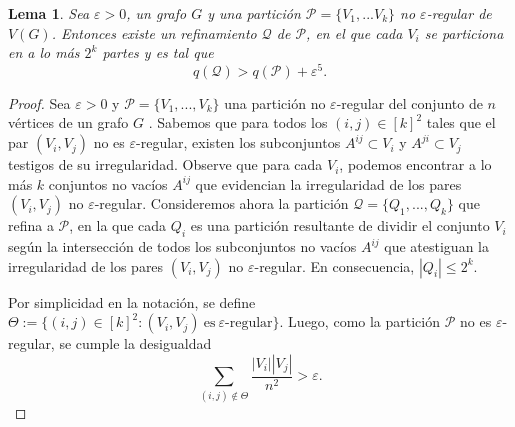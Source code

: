 \documentclass{article}[14pts]
\newtheorem{lema}{Lema}
\let\varepsilon=\varepsilon
\begin{document}
\begin{lema} \label{Energy boost particiones}
    Sea $\varepsilon > 0$, un grafo $G$ y una partición $\mathcal{P} = \lbrace V_1,...V_k\rbrace$ no $\varepsilon$-regular de $V(G)$. Entonces existe un refinamiento $\mathcal{Q}$ de $\mathcal{P}$, en el que cada $V_i$ se particiona en a lo más $2^{k}$ partes y es tal que
    \begin{equation*}
        q(\mathcal{Q}) > q(\mathcal{P}) + \varepsilon^{5}.
    \end{equation*}
\end{lema}

\begin{proof}
    Sea $\varepsilon > 0$ y $\mathcal{P} = \lbrace V_1,...,V_k\rbrace$ una partición no $\varepsilon$-regular del conjunto de $n$ vértices de un grafo $G$ . Sabemos que para todos los $(i,j)\in [k]^{2}$ tales que el par $(V_i, V_j)$ no es $\varepsilon$-regular, existen los subconjuntos $A^{ij}\subset V_i$ y $A^{ji}\subset V_j$ testigos de su irregularidad. Observe que para cada $V_i$, podemos encontrar a lo más $k$ conjuntos no vacíos $A^{ij}$ que evidencian la irregularidad de los pares $(V_i, V_j)$ no $\varepsilon$-regular. Consideremos ahora la partición $\mathcal{Q} = \lbrace Q_1,...,Q_k\rbrace$ que refina a $\mathcal{P}$, en la que cada $Q_i$ es una partición resultante de dividir el conjunto $V_i$ según la intersección de todos los subconjuntos no vacíos $A^{ij}$ que atestiguan la irregularidad de los pares $(V_i, V_j)$ no $\varepsilon$-regular. En consecuencia, $|Q_i| \leq 2^{k}$.

    Por simplicidad en la notación, se define $\Theta := \lbrace (i,j)\in [k]^{2} : (V_i,V_j)\ \text{es}\ \varepsilon\text{-regular}\rbrace$. Luego, como la partición $\mathcal{P}$ no es $\varepsilon$-regular, se cumple la desigualdad
    \begin{equation} \label{condición partición no regular}
        \sum_{(i,j)\not\in \Theta} \frac{|V_i||V_j|}{n^{2}} > \varepsilon.
    \end{equation}


\end{proof}
\end{document}
